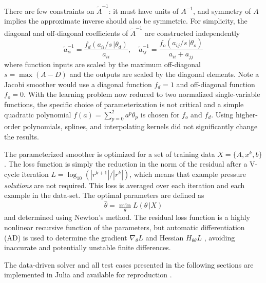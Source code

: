 \documentclass[review]{elsarticle}
\begin{document}
There are few constraints on $\tilde A^{-1}$: it must have units of $A^{-1}$, and symmetry of $A$ implies the approximate inverse should also be symmetric. For simplicity, the diagonal and off-diagonal coefficients of $\tilde A^{-1}$ are constructed independently 
\begin{equation}\label{eq:approxinv}
    \tilde a^{-1}_{ii} = \frac{f_d(a_{ii}/s\,|\theta_d)}{a_{ii}} , \quad
    \tilde a^{-1}_{ij} = \frac{f_o(a_{ij}/s\,|\theta_o)}{a_{ii}+a_{jj}}
\end{equation}
where function inputs are scaled by the maximum off-diagonal $s=\max(A-D)$ and the outputs are scaled by the diagonal elements. Note a Jacobi smoother would use a diagonal function $f_d=1$ and off-diagonal function $f_o=0$. With the learning problem now reduced to two normalized single-variable functions, the specific choice of parameterization is not critical and a simple quadratic polynomial $f(a) = \sum_{p=0}^2 a^p \theta_p$ is chosen for $f_o$ and $f_d$. Using higher-order polynomials, splines, and interpolating kernels did not significantly change the results.

The parameterized smoother is optimized for a set of training data $X=\{A,x^k,b\}$. The loss function is simply the reduction in the norm of the residual after a V-cycle iteration $L = \log_{10}(|r^{k+1}| / |r^{k}|)$, which means that example pressure \textit{solutions} are not required. This loss is averaged over each iteration and each example in the data-set. The optimal parameters are defined as
\begin{equation}
    \hat\theta = \min_\theta L(\theta\, |X)
\end{equation}
and determined using Newton's method. The residual loss function is a highly nonlinear recursive function of the parameters, but automatic differentiation (AD) is used to determine the gradient $\nabla_\theta L$ and Hessian $H_{\theta\theta} L$ \cite{RevelsLubinPapamarkou2016}, avoiding inaccurate and potentially unstable finite differences.

The data-driven solver and all test cases presented in the following sections are implemented in Julia and available for reproduction \cite{bezanson2017julia,weymouth2021julia}.
\end{document}
